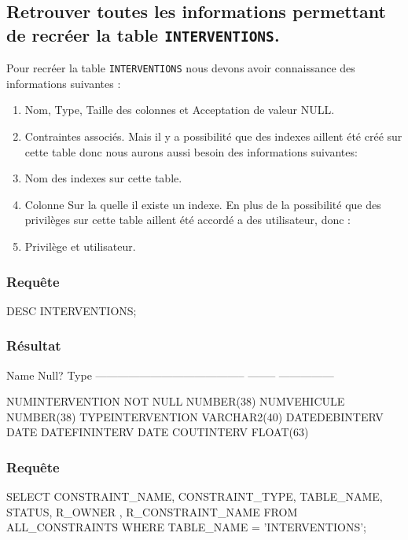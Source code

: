 \documentclass[•]{article}
\begin{document}
\subsection{Retrouver toutes les informations permettant de recréer la table \texttt{INTERVENTIONS}.}
Pour recréer la table \texttt{INTERVENTIONS} nous devons avoir connaissance des informations suivantes : 
\begin{enumerate}
	\item Nom, Type, Taille des colonnes et Acceptation de valeur NULL.
	\item Contraintes associés.
	Mais il y a possibilité que des indexes aillent été créé sur cette table donc nous aurons aussi besoin des informations suivantes:
	\item Nom des indexes sur cette table.
	\item Colonne Sur la quelle il existe un indexe.
	En plus de la possibilité que des privilèges sur cette table aillent été accordé a des utilisateur, donc :
	\item Privilège et utilisateur. 
\end{enumerate} 

\subsubsection{Requête}
\begin{sql}
 DESC INTERVENTIONS;
\end{sql}

\subsubsection{Résultat}
\begin{sql}
 Name                                      Null?    Type
 ----------------------------------------- -------- ---------------

 NUMINTERVENTION                           NOT NULL NUMBER(38)
 NUMVEHICULE                                        NUMBER(38)
 TYPEINTERVENTION                                   VARCHAR2(40)
 DATEDEBINTERV                                      DATE
 DATEFININTERV                                      DATE
 COUTINTERV                                         FLOAT(63)
\end{sql}

\subsubsection{Requête}
\begin{sql}
 SELECT CONSTRAINT_NAME, CONSTRAINT_TYPE, TABLE_NAME, STATUS, R_OWNER , R_CONSTRAINT_NAME  
 FROM ALL_CONSTRAINTS 
 WHERE TABLE_NAME = 'INTERVENTIONS';
\end{sql}
\end{document}
